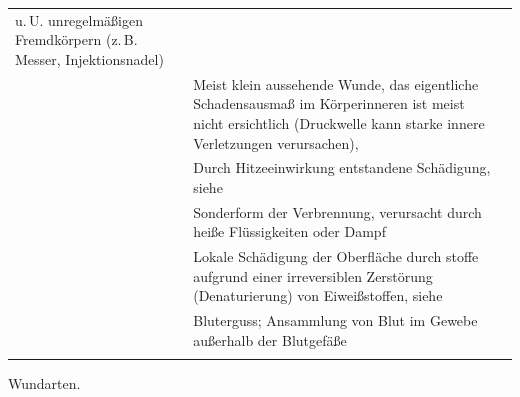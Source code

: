 {\begin{tabulary}{\linewidth}{lLL}
u.\,U. unregelmäßigen Fremdkörpern (z.\,B. Messer,
Injektionsnadel) 
& 
\noindent{}
\\\addlinespace 
\noindent{} 
&
Meist klein aussehende Wunde, das eigentliche Schadensausmaß im Körperinneren
ist meist nicht ersichtlich (Druckwelle kann starke innere
Verletzungen verursachen),
& 
\noindent{}
\\\addlinespace
\noindent{} 
&
Durch Hitzeeinwirkung entstandene Schädigung, siehe 
& 
\noindent{}
\\\addlinespace
\noindent{} 
&
Sonderform der Verbrennung, verursacht durch heiße Flüssigkeiten oder Dampf
& 
\noindent{}
\\\addlinespace
\noindent{} 
&
Lokale Schädigung der
Oberfläche durch stoffe aufgrund einer irreversiblen Zerstörung (Denaturierung) von
Eiweißstoffen, siehe 
& 
\noindent{}
\\\addlinespace
\noindent{} 
&
Bluterguss; Ansammlung von Blut im Gewebe außerhalb der Blutgefäße 
& 
\noindent{}
\\\addlinespace\bottomrule
\end{tabulary}
}{Wundarten.}{}


